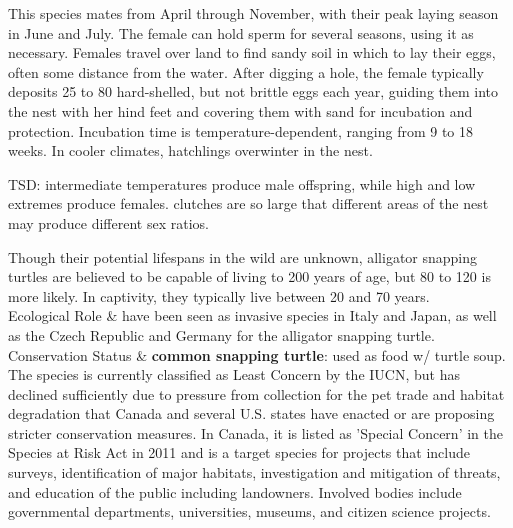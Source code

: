 \begin{center}
\begin{longtabu}
	 This species mates from April through November, with their peak laying season in June and July. The female can hold sperm for several seasons, using it as necessary. Females travel over land to find sandy soil in which to lay their eggs, often some distance from the water. After digging a hole, the female typically deposits 25 to 80 hard-shelled, but not brittle eggs each year, guiding them into the nest with her hind feet and covering them with sand for incubation and protection. Incubation time is temperature-dependent, ranging from 9 to 18 weeks. In cooler climates, hatchlings overwinter in the nest. 
	 
	 TSD: intermediate temperatures produce male offspring, while high and low extremes produce females. clutches are so large that different areas of the nest may produce different sex ratios.
	 
	 Though their potential lifespans in the wild are unknown, alligator snapping turtles are believed to be capable of living to 200 years of age, but 80 to 120 is more likely. In captivity, they typically live between 20 and 70 years.
	\\
	\hline
	Ecological Role &
	have been seen as invasive species in Italy and Japan, as well as the Czech Republic and Germany for the alligator snapping turtle.
	\\
	\hline
	Conservation Status & 
	\textbf{common snapping turtle}: used as food w/ turtle soup. The species is currently classified as Least Concern by the IUCN, but has declined sufficiently due to pressure from collection for the pet trade and habitat degradation that Canada and several U.S. states have enacted or are proposing stricter conservation measures. In Canada, it is listed as 'Special Concern' in the Species at Risk Act in 2011 and is a target species for projects that include surveys, identification of major habitats, investigation and mitigation of threats, and education of the public including landowners. Involved bodies include governmental departments, universities, museums, and citizen science projects.


\end{longtabu}
\end{center}
